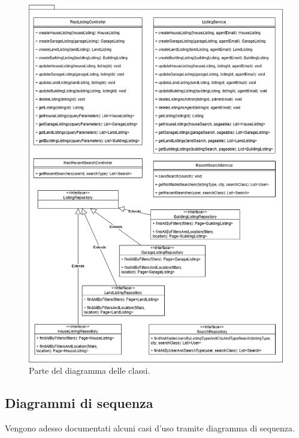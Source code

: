 \begin{figure}[H]
    \centering
    \includegraphics[width=\textwidth]{assets/diagrams/class-diagram/class-diagram-4.png}
    \caption{Parte del diagramma delle classi.}
    \label{fig:Parte 4 del diagramma delle classi}
\end{figure}

\subsection{Diagrammi di sequenza}
Vengono adesso documentati alcuni casi d'uso tramite diagramma di sequenza.

